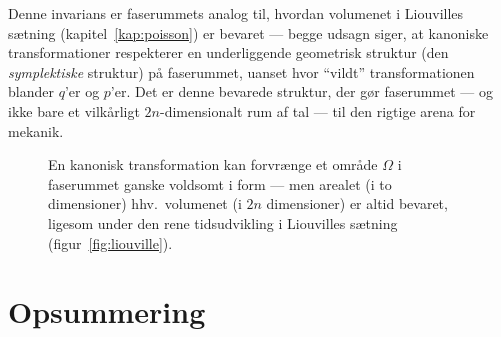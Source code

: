 \begin{bemaerkning}
Denne invarians er faserummets analog til, hvordan volumenet i
Liouvilles sætning (kapitel~\ref{kap:poisson}) er bevaret — begge
udsagn siger, at kanoniske transformationer respekterer en underliggende
geometrisk struktur (den \emph{symplektiske} struktur) på faserummet,
uanset hvor ``vildt'' transformationen blander $q$'er og $p$'er. Det er
denne bevarede struktur, der gør faserummet — og ikke bare et vilkårligt
$2n$-dimensionalt rum af tal — til den rigtige arena for mekanik.
\end{bemaerkning}

\begin{figure}[htbp]
  \centering
  \caption{En kanonisk transformation kan forvrænge et område $\Omega$ i
  faserummet ganske voldsomt i form — men arealet (i to dimensioner)
  hhv.\ volumenet (i $2n$ dimensioner) er altid bevaret, ligesom under
  den rene tidsudvikling i Liouvilles sætning
  (figur~\ref{fig:liouville}).}
  \label{fig:kanonisk-transf}
\end{figure}

\section{Opsummering}

